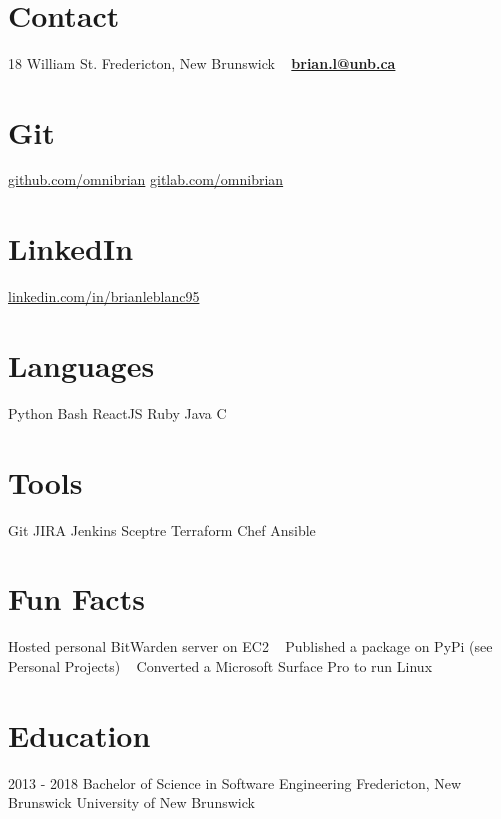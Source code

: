 \documentclass[a4paper]{resume}
\begin{document}


\begin{aside}
    ~
    ~
    ~
    ~
    ~
  \section{Contact}
    18 William St.
    Fredericton,
    New Brunswick
    ~
    \textbf{\href{mailto:brian.l@unb.ca}{brian.l@unb.ca}}
    ~
  \section{Git}
    \href{https://github.com/omnibrian}{github.com/omnibrian}
    \href{https://gitlab.com/omnibrian}{gitlab.com/omnibrian}
    ~
  \section{LinkedIn}
    \href{https://www.linkedin.com/in/brianleblanc95/}{linkedin.com/in/brianleblanc95}
    ~
  \section{Languages}
    Python
    Bash
    ReactJS
    Ruby
    Java
    C
    ~
  \section{Tools}
    Git
    JIRA
    Jenkins
    Sceptre
    Terraform
    Chef
    Ansible
    ~
  \section{Fun Facts}
    Hosted personal BitWarden server on EC2
    ~
    Published a package on PyPi (see Personal Projects)
    ~
    Converted a Microsoft Surface Pro to run Linux
    ~
\end{aside}

\section{Education}
\begin{entrylist}
  \entry
    {2013 - 2018}
    {Bachelor of Science in Software Engineering}
    {Fredericton, New Brunswick}
    {University of New Brunswick}
\end{entrylist}
\end{document}
